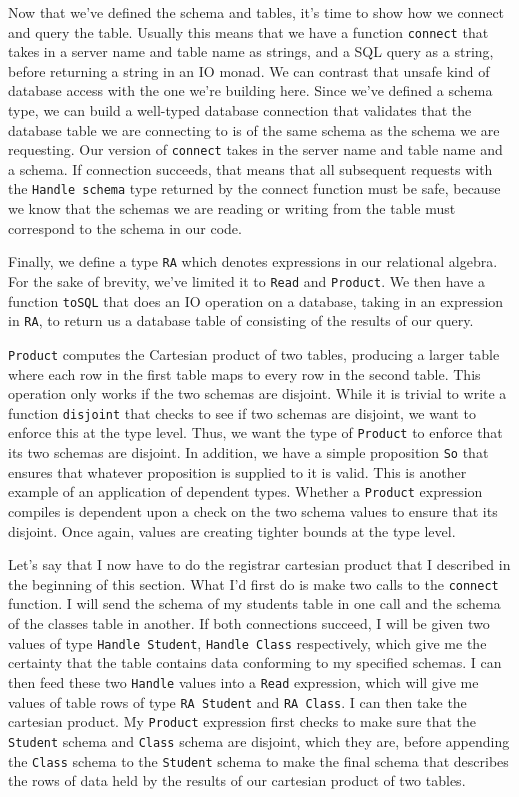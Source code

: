 Now that we've defined the schema and tables, it's time to show how we connect
and query the table. Usually this means that we have a function \texttt{connect}
that takes in a server name and table name as strings, and a SQL query as a
string, before returning a string in an IO monad. We can contrast that unsafe
kind of database access with the one we're building here. Since we've defined a
schema type, we can build a well-typed database connection that validates that
the database table we are connecting to is of the same schema as the schema we
are requesting. Our version of \texttt{connect} takes in the server name and
table name and a schema. If connection succeeds, that means that all subsequent
requests with the \texttt{Handle schema} type returned by the connect function
must be safe, because we know that the schemas we are reading or writing from
the table must correspond to the schema in our code. 

Finally, we define a type \texttt{RA} which denotes expressions in our
relational algebra. For the sake of brevity, we've limited it to \texttt{Read}
and \texttt{Product}. We then have a function \texttt{toSQL} that does an IO
operation on a database, taking in an expression in \texttt{RA}, to return us a
database table of consisting of the results of our query. 

\texttt{Product} computes the Cartesian product of two tables, producing a
larger table where each row in the first table maps to every row in the second
table. This operation only works if the two schemas are disjoint. While it is
trivial to write a function \texttt{disjoint} that checks to see if two schemas
are disjoint, we want to enforce this at the type level. Thus, we want the type
of \texttt{Product} to enforce that its two schemas are disjoint. In addition,
we have a simple proposition \texttt{So} that ensures that whatever proposition
is supplied to it is valid. This is another example of an application of
dependent types. Whether a \texttt{Product} expression compiles is dependent
upon a check on the two schema values to ensure that its disjoint. Once again,
values are creating tighter bounds at the type level. 

Let's say that I now have to do the registrar cartesian product that I described
in the beginning of this section. What I'd first do is make two calls to the
\texttt{connect} function. I will send the schema of my students table in one
call and the schema of the classes table in another. If both connections
succeed, I will be given two values of type \texttt{Handle Student},
\texttt{Handle Class} respectively, which give me the certainty that the table
contains data conforming to my specified schemas. I can then feed these two
\texttt{Handle} values into a \texttt{Read} expression, which will give me
values of table rows of type \texttt{RA Student} and \texttt{RA Class}. I can
then take the cartesian product. My \texttt{Product} expression first checks to
make sure that the \texttt{Student} schema and \texttt{Class} schema are
disjoint, which they are, before appending the \texttt{Class} schema to the
\texttt{Student} schema to make the final schema that describes the rows of data
held by the results of our cartesian product of two tables. 

